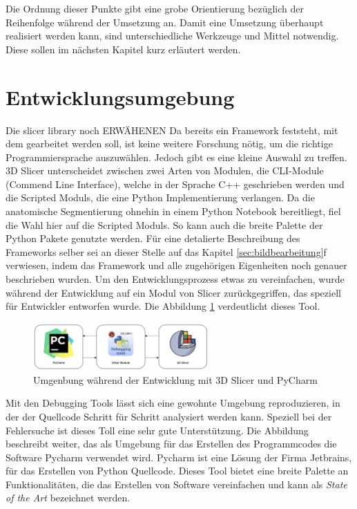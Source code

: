 Die Ordnung dieser Punkte gibt eine grobe Orientierung bezüglich der Reihenfolge
während der Umsetzung an. Damit eine Umsetzung überhaupt realisiert werden kann,
sind unterschiedliche Werkzeuge und Mittel notwendig. Diese sollen im nächsten
Kapitel kurz erläutert werden.

\section{Entwicklungsumgebung}
Die slicer library noch ERWÄHENEN Da bereits ein Framework feststeht, mit dem gearbeitet
werden soll, ist keine weitere Forschung nötig, um die richtige Programmiersprache
auszuwählen. Jedoch gibt es eine kleine Auswahl zu treffen. 3D Slicer unterscheidet
zwischen zwei Arten von Modulen, die CLI-Module (Commend Line Interface), welche
in der Sprache C++ geschrieben werden und die Scripted Moduls, die eine Python
Implementierung verlangen. Da die anatomische Segmentierung ohnehin in einem Python
Notebook bereitliegt, fiel die Wahl hier auf die Scripted Moduls. So kann auch die
breite Palette der Python Pakete genutzte werden. Für eine detalierte
Beschreibung des Frameworks selber sei an dieser Stelle auf das Kapitel
\ref{sec:bildbearbeitung}f verwiesen, indem das Framework und alle zugehörigen
Eigenheiten noch genauer beschrieben wurden. Um den Entwicklungsprozess etwas zu
vereinfachen, wurde während der Entwicklung auf ein Modul von Slicer
zurückgegriffen, das speziell für Entwickler entworfen wurde. Die Abbildung
\ref{fig:entwicklungsumgebung} verdeutlicht dieses Tool.

\begin{figure}[h]
	\centering
	\includegraphics[width=0.6\textwidth]{img/Entwicklungsumgebung.png}
	\caption{Umgenbung während der Entwicklung mit 3D Slicer und PyCharm}
	\label{fig:entwicklungsumgebung}
\end{figure}

Mit den Debugging Tools lässt sich eine gewohnte Umgebung reproduzieren, in der
der Quellcode Schritt für Schritt analysiert werden kann. Speziell bei der Fehlersuche
ist dieses Toll eine sehr gute Unterstützung. Die Abbildung beschreibt weiter, das
als Umgebung für das Erstellen des Programmcodes die Software Pycharm verwendet wird.
Pycharm ist eine Lösung der Firma Jetbrains, für das Erstellen von Python Quellcode.
Dieses Tool bietet eine breite Palette an Funktionalitäten, die das Erstellen von
Software vereinfachen und kann als \textit{State of the Art} bezeichnet werden.

